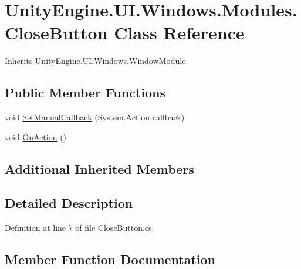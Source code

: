 \hypertarget{class_unity_engine_1_1_u_i_1_1_windows_1_1_modules_1_1_close_button}{}\section{Unity\+Engine.\+U\+I.\+Windows.\+Modules.\+Close\+Button Class Reference}
\label{class_unity_engine_1_1_u_i_1_1_windows_1_1_modules_1_1_close_button}


Inherits \hyperlink{class_unity_engine_1_1_u_i_1_1_windows_1_1_window_module}{Unity\+Engine.\+U\+I.\+Windows.\+Window\+Module}.

\subsection*{Public Member Functions}
\begin{DoxyCompactItemize}
\item 
void \hyperlink{class_unity_engine_1_1_u_i_1_1_windows_1_1_modules_1_1_close_button_a2d7de60cb3a1d6c2295cc710bf5e67e5}{Set\+Manual\+Callback} (System.\+Action callback)
\item 
void \hyperlink{class_unity_engine_1_1_u_i_1_1_windows_1_1_modules_1_1_close_button_a7ced74c4c338da81632b0d4455df3ef6}{On\+Action} ()
\end{DoxyCompactItemize}
\subsection*{Additional Inherited Members}


\subsection{Detailed Description}


Definition at line 7 of file Close\+Button.\+cs.



\subsection{Member Function Documentation}
\hypertarget{class_unity_engine_1_1_u_i_1_1_windows_1_1_modules_1_1_close_button_a7ced74c4c338da81632b0d4455df3ef6}{}
